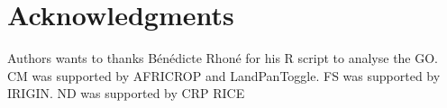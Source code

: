 \documentclass[10pt,letterpaper]{article}
\begin{document}
% 
% 

\section*{Acknowledgments}
Authors wants to thanks Bénédicte Rhoné for his R script to analyse the GO.
CM was supported by AFRICROP and LandPanToggle. FS was supported by IRIGIN. ND was supported by CRP RICE
\end{document}
